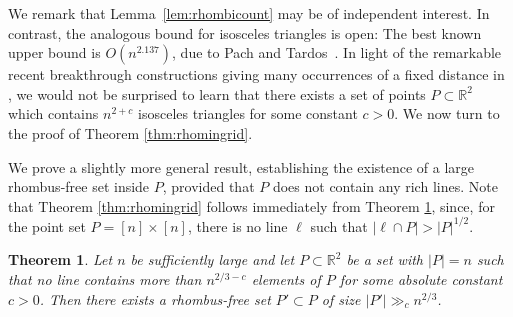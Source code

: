\documentclass[11pt,oneside]{amsart}
\numberwithin{exercise}{subsection}
\newtheorem{theorem}{Theorem}
\begin{document}
We remark that Lemma~\ref{lem:rhombicount} may be of independent interest. 
In contrast, the analogous bound for isosceles triangles is open: 
The best known upper bound is \(O(n^{2.137})\), due to Pach and Tardos~\cite{PaTa02}. In light of the remarkable recent breakthrough constructions giving many occurrences of a fixed distance in \cite{OpenAI2026PlanarUnitDistanceBlog}, we would not be surprised to learn that there exists a set of points $P \subset \mathbb R^2$ which contains $n^{2+c}$ isosceles triangles for some constant $c>0$. We now turn to the proof of Theorem \ref{thm:rhomingrid}. 

We prove a slightly more general result, establishing the existence of a large rhombus-free set inside $P$, provided that $P$ does not contain any rich lines. Note that Theorem \ref{thm:rhomingrid} follows immediately from Theorem \ref{thm:rhombigen}, since, for the point set $P=[n] \times [n]$, there is no line $\ell$ such that $|\ell \cap P| > |P|^{1/2}$.

\begin{theorem} \label{thm:rhombigen}
Let $n$ be sufficiently large and let $P \subset \mathbb R^2$ be a set with $|P|=n$ such that no line contains more than $n^{2/3-c}$ elements of $P$ for some absolute constant $c>0$. Then there exists a rhombus-free set $P' \subset P$ of size $|P'| \gg_c n^{2/3}$.
\end{theorem}
\end{document}
